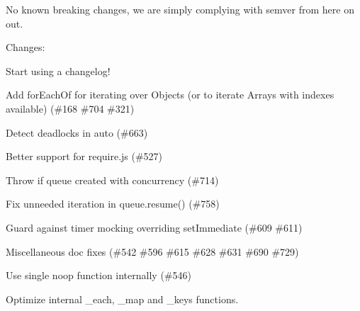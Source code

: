 No known breaking changes, we are simply complying with semver from here on out.

Changes\+:


\begin{DoxyItemize}
\item Start using a changelog!
\item Add {\ttfamily for\+Each\+Of} for iterating over Objects (or to iterate Arrays with indexes available) (\#168 \#704 \#321)
\item Detect deadlocks in {\ttfamily auto} (\#663)
\item Better support for require.\+js (\#527)
\item Throw if queue created with concurrency {} (\#714)
\item Fix unneeded iteration in {\ttfamily queue.\+resume()} (\#758)
\item Guard against timer mocking overriding {\ttfamily set\+Immediate} (\#609 \#611)
\item Miscellaneous doc fixes (\#542 \#596 \#615 \#628 \#631 \#690 \#729)
\item Use single noop function internally (\#546)
\item Optimize internal {\ttfamily \+\_\+each}, {\ttfamily \+\_\+map} and {\ttfamily \+\_\+keys} functions. 
\end{DoxyItemize}